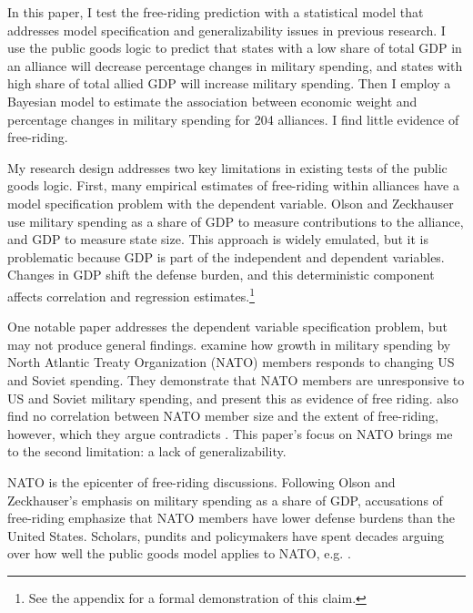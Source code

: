 \documentclass[12pt]{article}
\begin{document}
In this paper, I test the free-riding prediction with a statistical model that addresses model specification and generalizability issues in previous research. 
I use the public goods logic to predict that states with a low share of total GDP in an alliance will decrease percentage changes in military spending, and states with high share of total allied GDP will increase military spending.
Then I employ a Bayesian model to estimate the association between economic weight and percentage changes in military spending for 204 alliances. 
I find little evidence of free-riding. 


My research design addresses two key limitations in existing tests of the public goods logic.
First, many empirical estimates of free-riding within alliances have a model specification problem with the dependent variable.
Olson and Zeckhauser use military spending as a share of GDP to measure contributions to the alliance, and GDP to measure state size.
This approach is widely emulated, but it is problematic because GDP is part of the independent and dependent variables.
Changes in GDP shift the defense burden, and this deterministic component affects correlation and regression estimates.\footnote{See the appendix for a formal demonstration of this claim.}  


One notable paper addresses the dependent variable specification problem, but may not produce general findings. 
\citet{PluemperNeumayer2015} examine how growth in military spending by North Atlantic Treaty Organization (NATO) members responds to changing US and Soviet spending.
They demonstrate that NATO members are unresponsive to US and Soviet military spending, and present this as evidence of free riding.
\citet{PluemperNeumayer2015} also find no correlation between NATO member size and the extent of free-riding, however, which they argue contradicts \citet{OlsonZeckhauser1966}.
This paper's focus on NATO brings me to the second limitation: a lack of generalizability. 


NATO is the epicenter of free-riding discussions. 
Following Olson and Zeckhauser's emphasis on military spending as a share of GDP, accusations of free-riding emphasize that NATO members have lower defense burdens than the United States. 
Scholars, pundits and policymakers have spent decades arguing over how well the public goods model applies to NATO, e.g. \citep{Pryor1968, SandlerForbes1980, Palmer1990, HiltonVhu1991, Boyer1993, GatesTerasawa1992, SandlerHartley2001, Lanoszka2015, PluemperNeumayer2015, KimSandler2019}.
\end{document}
